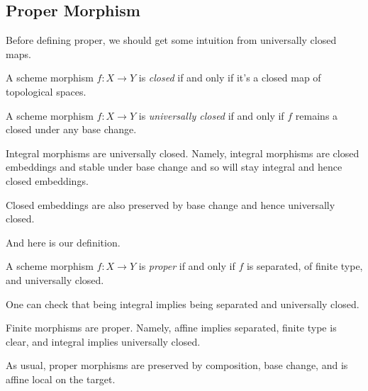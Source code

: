 \documentclass[../notes.tex]{subfiles}
\begin{document}
\subsection{Proper Morphism}
Before defining proper, we should get some intuition from universally closed maps.
\begin{definition}
	A scheme morphism $f\colon X\to Y$ is \textit{closed} if and only if it's a closed map of topological spaces.
\end{definition}
\begin{definition}
	A scheme morphism $f\colon X\to Y$ is \textit{universally closed} if and only if $f$ remains a closed under any base change.
\end{definition}
\begin{example}
	Integral morphisms are universally closed. Namely, integral morphisms are closed embeddings and stable under base change and so will stay integral and hence closed embeddings.
\end{example}
\begin{example}
	Closed embeddings are also preserved by base change and hence universally closed.
\end{example}
And here is our definition.
\begin{definition}[Proper]
	A scheme morphism $f\colon X\to Y$ is \textit{proper} if and only if $f$ is separated, of finite type, and universally closed.
\end{definition}
\begin{remark}
	One can check that being integral implies being separated and universally closed.
\end{remark}
\begin{example}
	Finite morphisms are proper. Namely, affine implies separated, finite type is clear, and integral implies universally closed.
\end{example}
\begin{remark}
	As usual, proper morphisms are preserved by composition, base change, and is affine local on the target.
\end{remark}
\end{document}
